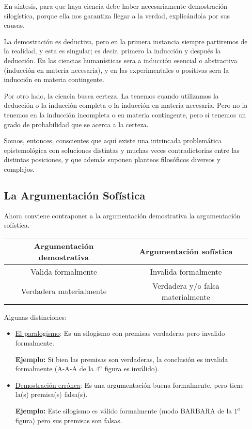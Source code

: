 \documentclass{article}
\begin{document}
En síntesis, para que haya ciencia debe haber necesariamente demostración silogística, porque ella nos garantiza llegar a la verdad, explicándola por sus causas.
\par La demostración es deductiva, pero en la primera instancia siempre partiremos de la realidad, y esta es singular; es decir, primero la inducción y después la deducción. En las ciencias humanísticas sera a inducción esencial o abstractiva (inducción en materia necesaria), y en las experimentales o positivas sera la inducción en materia contingente.
\par Por otro lado, la ciencia busca certeza. La tenemos cuando utilizamos la deducción o la inducción completa o la inducción en materia necesaria. Pero no la tenemos en la inducción incompleta o en materia contingente, pero sí tenemos un grado de probabilidad que se acerca a la certeza.
\par Somos, entonces, conscientes que aquí existe una intrincada problemática epistemológica con soluciones distintas y muchas veces contradictorias entre las distintas posiciones, y que además suponen planteos filosóficos diversos y complejos.


\subsection{La Argumentación Sofística}

Ahora conviene contraponer a la argumentación demostrativa la argumentación sofística.

\begin{center}
\begin{tabular}{|c|c|}
\hline
     Argumentación demostrativa & Argumentación sofística  \\
\hline
     Valida formalmente & Invalida formalmente \\
     Verdadera materialmente & Verdadera y/o falsa materialmente \\
\hline
\end{tabular}
\end{center}

Algunas distinciones:

\begin{itemize}
    \item \underline{El paralogismo}: Es un silogismo con premisas verdaderas pero invalido formalmente.
    \par \textbf{Ejemplo:}
    Si bien las premisas son verdaderas, la conclusión es invalida formalmente (A-A-A de la $4^a$ figura es inválido).
    
    \item \underline{Demostración errónea}: Es una argumentación buena formalmente, pero tiene la(s) premisa(s) falsa(s).
    \par \textbf{Ejemplo:}
    Este silogismo es válido formalmente (modo BARBARA de la $1^a$ figura) pero sus premisas son falsas.
\end{itemize}
\end{document}
